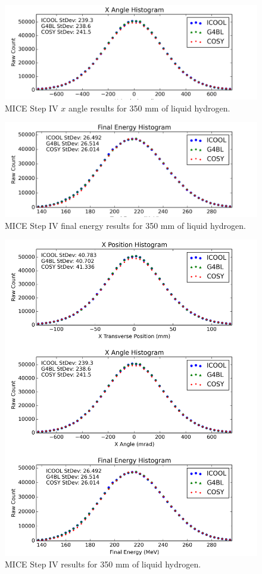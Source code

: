 \documentclass[a4paper,11pt]{article}
\begin{document}
\begin{figure}[htb]
  \centering
    \includegraphics[width=\columnwidth]{Figures/px} 
  \caption{MICE Step IV $x$ angle results for 350 mm of liquid hydrogen.}
  \label{fig:micexangle}
\end{figure}

\begin{figure}[htb]
  \centering
    \includegraphics[width=\columnwidth]{Figures/e} 
  \caption{MICE Step IV final energy results for 350 mm of liquid hydrogen.}
  \label{fig:miceenergy}
\end{figure}
\fi

\begin{figure}[!ht]
  \centering
    \includegraphics[width=0.7\columnwidth]{Figures/MICE_LH} 
  \caption{MICE Step IV results for 350 mm of liquid hydrogen.}
  \label{fig:mice_lh}
\end{figure}
\end{document}
